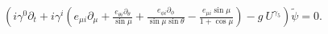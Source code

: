 \begin{equation}
\label{Dpolar2}
\left( i \gamma^0 \partial_t + 
i \gamma^i \left(
e_{\mu i} \partial_\mu +
\tfrac{e_{\theta i} \partial_\theta}{\sin \mu} + 
\tfrac{e_{\phi i} \partial_\phi}{\sin \mu \sin \theta} -
\tfrac{e_{\mu i} \sin \mu}{1 + \cos \mu} 
\right)
- g~U^{\gamma_5}
\right)
{\tilde \psi}  = 0.
\end{equation}

